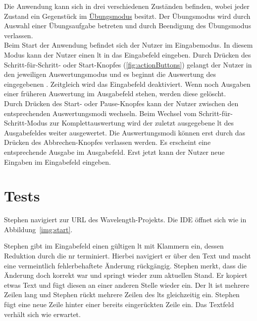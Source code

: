\documentclass[parskip=full,11pt,twoside]{scrartcl}
\begin{document}
Die Anwendung kann sich in drei verschiedenen Zuständen befinden, wobei jeder Zustand ein Gegenstück im \hyperref[fnc:ex]{Übungsmodus} besitzt. 
Der Übungsmodus wird durch Auswahl einer Übungsaufgabe betreten und durch Beendigung des Übungsmodus verlassen.\\
Beim Start der Anwendung befindet sich der Nutzer im Eingabemodus. In diesem Modus kann der Nutzer einen \gls{lt} in das Eingabefeld eingeben. 
Durch Drücken des Schritt-für-Schritt- oder Start-Knopfes (\cref{fig:actionButtons}) gelangt der Nutzer in den jeweiligen Auswertungsmodus und es beginnt die Auswertung des eingegebenen . 
Zeitgleich wird das Eingabefeld deaktiviert. Wenn noch Ausgaben einer früheren Auswertung im Ausgabefeld stehen, werden diese gelöscht.\\ 
Durch Drücken des Start- oder Pause-Knopfes kann der Nutzer zwischen den entsprechenden Auswertungsmodi wechseln. 
Beim Wechsel vom Schritt-für-Schritt-Modus zur Komplettauswertung wird der zuletzt ausgegebene \gls{lt} des Ausgabefeldes weiter ausgewertet.
Die Auswertungsmodi können erst durch das Drücken des Abbrechen-Knopfes verlassen werden. Es erscheint eine entsprechende Ausgabe im Ausgabefeld. Erst jetzt kann der Nutzer neue Eingaben im Eingabefeld eingeben.


\section{Tests}


{Stephen navigiert zur URL des Wavelength-Projekts.}
{Die IDE öffnet sich wie in Abbildung~\ref{img:start}.}

{Stephen gibt im Eingabefeld einen gültigen \gls{lt} mit Klammern ein,
dessen Reduktion durch die \gls{nr} terminiert.
Hierbei navigiert er über den Text und macht eine vermeintlich fehlerbehaftete Änderung rückgängig. 
Stephen merkt, dass die Änderung doch korrekt war und springt wieder zum aktuellen Stand. Er kopiert etwas Text und fügt diesen an einer anderen Stelle wieder ein.
Der \gls{lt} ist mehrere Zeilen lang und Stephen rückt mehrere Zeilen des \gls{lt}s gleichzeitig ein.
Stephen fügt eine neue Zeile hinter einer bereits eingerückten Zeile ein.}
{Das Textfeld verhält sich wie erwartet.}
\end{document}
